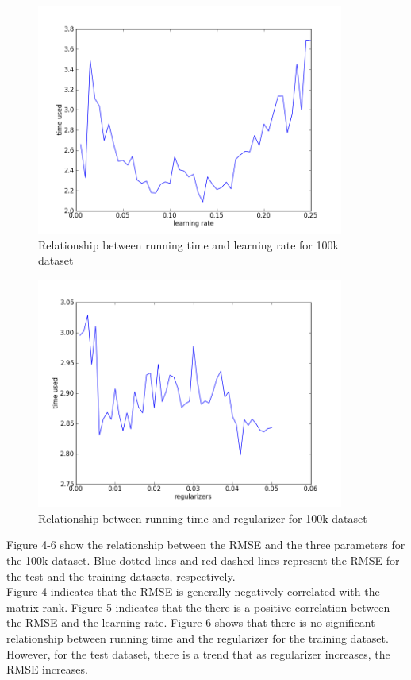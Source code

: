 \documentclass[12pt]{article}
\begin{document}
\begin{figure}[H]
\centering
\includegraphics[width=0.90\textwidth]{smalltimelr.png}
\caption{Relationship between running time and learning rate for 100k dataset}
\end{figure}

\begin{figure}[H]
\centering
\includegraphics[width=0.90\textwidth]{smalltimereg.png}
\caption{Relationship between running time and regularizer for 100k dataset}
\end{figure}

\noindent Figure 4-6 show the relationship between the RMSE and the three parameters
for the 100k dataset. Blue dotted lines and red dashed lines represent the RMSE for
the test and the training datasets, respectively.\\

\noindent Figure 4 indicates that the RMSE is generally negatively correlated
with the matrix rank. Figure 5 indicates that the there is a positive correlation
between the RMSE and the learning rate. Figure 6 shows that there is no significant 
relationship between running time and the regularizer for the training dataset. However,
for the test dataset, there is a trend that as regularizer increases, the RMSE increases.
\end{document}
